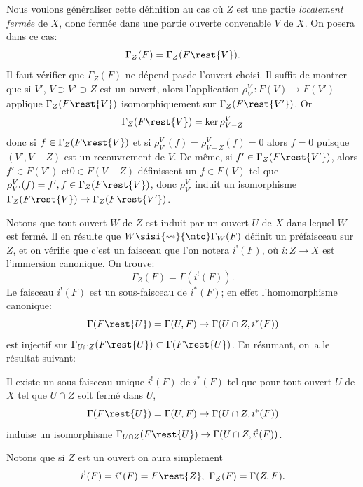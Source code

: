 Nous voulons g\'en\'eraliser cette d\'efinition au cas o\`u $Z$ est une partie \textit{localement ferm\'ee} de $X$, donc ferm\'ee dans une partie ouverte convenable $V$ de $X$. On posera dans ce cas:
\begin{equation} \label{eq:I.3} {\Gamma_Z(F)=\Gamma_Z(F\rest{V})}.
\end{equation}
Il faut v\'erifier que $\Gamma_Z(F)$ \og ne d\'epend pas\fg de l'ouvert choisi. Il suffit de montrer que si $V'$, $V\supset V' \supset Z$ est un ouvert, alors l'application $\rho_{V'}^V: F(V) \to F(V')$ applique $\Gamma_Z(F\rest{V})$ isomorphiquement sur $\Gamma_Z(F\rest{V'})$. Or
\begin{equation} \label{eq:I.4} { \Gamma_Z(F\rest{V}) = \ker \rho_{V-Z}^V}
\end{equation}
donc si $f\in \Gamma_Z(F\rest{V})$ et si $\rho_{V'}^V(f)=\rho_{V-Z}^V(f)=0$ alors $f=0$ puisque $(V', V-Z)$ est un recouvrement de $V$. De m\^eme, si $f'\in \Gamma_Z(F\rest{V'})$, alors $f'\in F(V')$ et\pageoriginale $0\in F(V-Z)$ d\'efinissent un $f\in F(V)$ tel que $\rho_{V'}^V(f)=f', f\in \Gamma_Z(F\rest{V})$, donc $\rho_{V'}^V$ induit un isomorphisme $\Gamma_Z(F\rest{V}) \to \Gamma_Z(F\rest{V'})$.

Notons que tout ouvert $W$ de $Z$ est induit par un ouvert $U$ de $X$ dans lequel $W$ est ferm\'e. Il en r\'esulte que $W \sisi{\rightsquigarrow}{\mto} \Gamma_W(F)$ d\'efinit un pr\'efaisceau sur $Z$, et on v\'erifie que c'est un faisceau que l'on notera $i^!(F)$, o\`u $i: Z \to X$ est l'immersion canonique. On trouve:
\begin{equation} \label{eq:I.5}
\Gamma_Z(F)=\Gamma(i^!(F)).
\end{equation}
Le faisceau $i^!(F)$ est un sous-faisceau de $i^*(F)$; en effet l'homomorphisme canonique:
$$
\Gamma(F\rest{U})=\Gamma(U, F) \to \Gamma(U\cap Z, i^*(F))$$
est injectif sur $\Gamma_{U\cap Z}(F\rest{U}) \subset \Gamma(F\rest{U})$. En r\'esumant, on~a le r\'esultat suivant:

\begin{proposition} \label{I.1.1} Il existe un sous-faisceau unique $i^!(F)$ de $i^*(F)$ tel que pour tout ouvert $U$ de $X$ tel que $U\cap Z$ soit ferm\'e dans $U$,
$$
\Gamma(F\rest{U})=\Gamma(U, F) \to \Gamma(U\cap Z, i^*(F))$$
induise un isomorphisme $\Gamma_{U \cap Z}(F\rest{U}) \to \Gamma(U\cap Z, i^!(F))$.
\end{proposition}

Notons que si $Z$ est un ouvert on aura simplement
\begin{equation} \label{eq:I.6} {i^!(F)=i^*(F)=F\rest{Z}, \ \Gamma_Z(F)=\Gamma(Z, F)}.
\end{equation}

